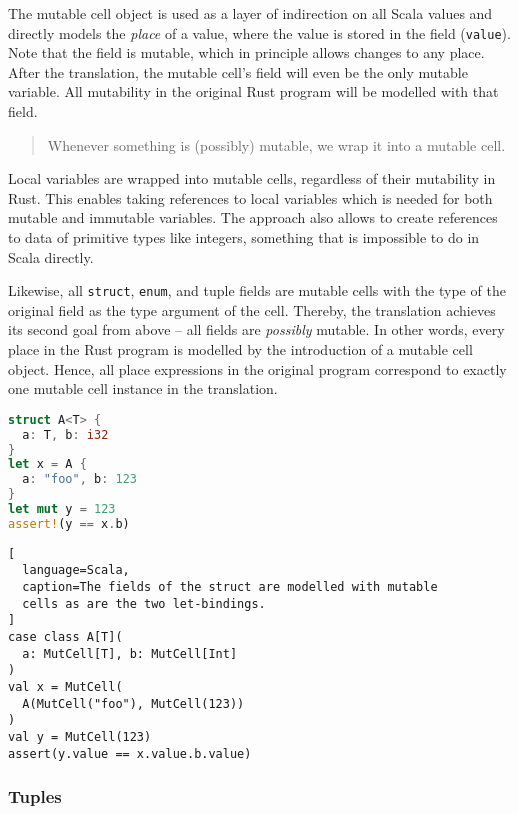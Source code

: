 The mutable cell object is used as a layer of indirection on all Scala values
and directly models the \emph{place} of a value, where the value is stored in
the field (\lstinline!value!). Note that the field is mutable, which in
principle allows changes to any place. After the translation, the mutable cell's
field will even be the only mutable variable. All mutability in the original
Rust program will be modelled with that field.

\begin{quote}
Whenever something is (possibly) mutable, we wrap it into a mutable cell.
\end{quote}

Local variables are wrapped into mutable cells, regardless of their mutability
in Rust. This enables taking references to local variables which is needed for
both mutable and immutable variables. The approach also allows to create
references to data of primitive types like integers, something that is
impossible to do in Scala directly.

Likewise, all \lstinline!struct!, \lstinline!enum!, and tuple fields are mutable
cells with the type of the original field as the type argument of the cell.
Thereby, the translation achieves its second goal from above -- all fields are
\emph{possibly} mutable. In other words, every place in the Rust program is
modelled by the introduction of a mutable cell object. Hence, all place
expressions in the original program correspond to exactly one mutable cell
instance in the translation.

\noindent\begin{minipage}[t]{.45\textwidth}
\begin{lstlisting}[language=Rust, caption={Example Rust struct.}]
struct A<T> {
  a: T, b: i32
}
let x = A {
  a: "foo", b: 123
}
let mut y = 123
assert!(y == x.b)
\end{lstlisting}
\end{minipage}\hfill
\begin{minipage}[t]{.52\textwidth}
\begin{lstlisting}[
  language=Scala,
  caption=The fields of the struct are modelled with mutable
  cells as are the two let-bindings.
]
case class A[T](
  a: MutCell[T], b: MutCell[Int]
)
val x = MutCell(
  A(MutCell("foo"), MutCell(123))
)
val y = MutCell(123)
assert(y.value == x.value.b.value)
\end{lstlisting}
\end{minipage}


\subsubsection{Tuples}

